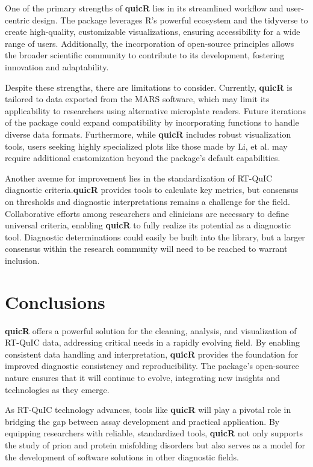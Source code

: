 \documentclass[preprint,12pt,a4paper]{elsarticle}
\providecommand{\DIFaddtex}[1]{{\protect\color{blue}\uwave{#1}}} %
\providecommand{\DIFaddbegin}{} %
\providecommand{\DIFaddend}{} %
\providecommand{\DIFadd}[1]{\texorpdfstring{\DIFaddtex{#1}}{#1}} %
\begin{document}
        One of the primary strengths of \textbf{quicR} lies in its streamlined workflow and user-centric design. The package leverages R’s powerful ecosystem and the tidyverse\DIFaddbegin \DIFadd{~}\DIFaddend \cite{tidyverse2019} to create high-quality, customizable visualizations, ensuring accessibility for a wide range of users. Additionally, the incorporation of open-source principles allows the broader scientific community to contribute to its development, fostering innovation and adaptability.

        Despite these strengths, there are limitations to consider. Currently, \textbf{quicR} is tailored to data exported from the MARS software, which may limit its applicability to researchers using alternative microplate readers. Future iterations of the package could expand compatibility by incorporating functions to handle diverse data formats. Furthermore, while \textbf{quicR} includes robust visualization tools, users seeking highly specialized plots like those made by Li, et al.\cite{Li2025} may require additional customization beyond the package’s default capabilities.

        Another avenue for improvement lies in the standardization of RT-QuIC diagnostic criteria.\DIFaddbegin \DIFadd{\ }\DIFaddend \textbf{quicR} provides tools to calculate key metrics, but consensus on thresholds and diagnostic interpretations remains a challenge for the field\DIFaddbegin \DIFadd{~}\DIFaddend \cite{Rowden2023}. Collaborative efforts among researchers and clinicians are necessary to define universal criteria, enabling \textbf{quicR} to fully realize its potential as a diagnostic tool. Diagnostic determinations could easily be built into the library, but a larger consensus within the research community will need to be reached to warrant inclusion.

    \section{Conclusions} 
        \textbf{quicR} offers a powerful solution for the cleaning, analysis, and visualization of RT-QuIC data, addressing critical needs in a rapidly evolving field. By enabling consistent data handling and interpretation, \textbf{quicR} provides the foundation for improved diagnostic consistency and reproducibility. The package's open-source nature ensures that it will continue to evolve, integrating new insights and technologies as they emerge.

        As RT-QuIC technology advances, tools like \textbf{quicR} will play a pivotal role in bridging the gap between assay development and practical application. By equipping researchers with reliable, standardized tools, \textbf{quicR} not only supports the study of prion and protein misfolding disorders but also serves as a model for the development of software solutions in other diagnostic fields.
\end{document}
